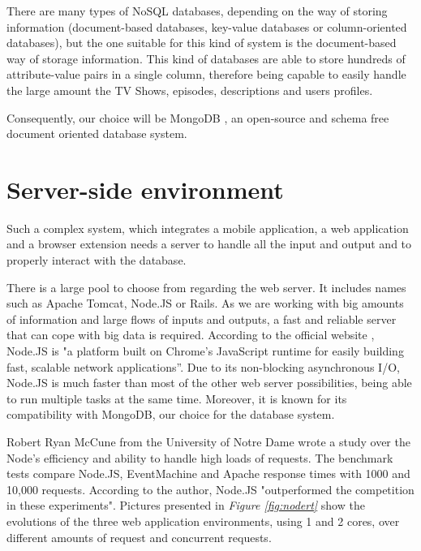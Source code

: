 There are many types of NoSQL databases, depending on the way of storing information (document-based databases, key-value databases or column-oriented databases), but the one suitable for this kind of system is the document-based way of storage information. This kind of databases are able to store hundreds of attribute-value pairs in a single column, therefore being capable to easily handle the large amount the TV Shows, episodes, descriptions and users profiles.

Consequently, our choice will be MongoDB \cite{11}, an open-source and schema free document oriented database system.

\section{Server-side environment}

Such a complex system, which integrates a mobile application, a web application and a browser extension needs a server to handle all the input and output and to properly interact with the database.

There is a large pool to choose from regarding the web server. It includes names such as Apache Tomcat, Node.JS or Rails. As we are working with big amounts of information and large flows of inputs and outputs, a fast and reliable server that can cope with big data is required. According to the official website \cite{12}, Node.JS is "a platform built on Chrome's JavaScript runtime for easily building fast, scalable network applications”. Due to its non-blocking asynchronous I/O, Node.JS is much faster than most of the other web server possibilities, being able to run multiple tasks at the same time. Moreover, it is known for its compatibility with MongoDB, our choice for the database system.

Robert Ryan McCune from the University of Notre Dame wrote a study \cite{13} over the Node's efficiency and ability to handle high loads of requests. The benchmark tests compare Node.JS, EventMachine and Apache response times with 1000 and 10,000 requests. According to the author, Node.JS "outperformed the competition in these experiments". Pictures presented in \textit{Figure \ref{fig:nodert}} show the evolutions of the three web application environments, using 1 and 2 cores, over different amounts of request and concurrent requests.

